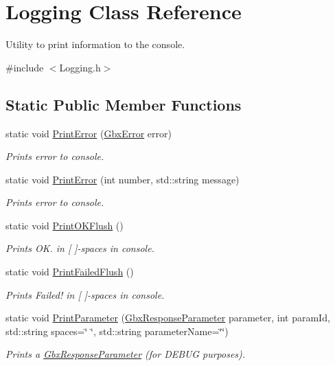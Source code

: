 \hypertarget{classLogging}{\section{Logging Class Reference}
\label{classLogging}
}


Utility to print information to the console.  




{\ttfamily \#include $<$Logging.\-h$>$}

\subsection*{Static Public Member Functions}
\begin{DoxyCompactItemize}
\item 
static void \hyperlink{classLogging_a7d4e2168b879a66d322d0b4fb2b298c4}{Print\-Error} (\hyperlink{structGbxError}{Gbx\-Error} error)
\begin{DoxyCompactList}\small\item\em Prints error to console. \end{DoxyCompactList}\item 
static void \hyperlink{classLogging_ac1397db1b8ea6625f7dd2616f530cd7d}{Print\-Error} (int number, std\-::string message)
\begin{DoxyCompactList}\small\item\em Prints error to console. \end{DoxyCompactList}\item 
\hypertarget{classLogging_a889f2ad8f991afdf0959cb1cad736fa7}{static void \hyperlink{classLogging_a889f2ad8f991afdf0959cb1cad736fa7}{Print\-O\-K\-Flush} ()}\label{classLogging_a889f2ad8f991afdf0959cb1cad736fa7}

\begin{DoxyCompactList}\small\item\em Prints O\-K. in \mbox{[} \mbox{]}-\/spaces in console. \end{DoxyCompactList}\item 
\hypertarget{classLogging_add0483bd14aef74ec988606cd7dbfc4b}{static void \hyperlink{classLogging_add0483bd14aef74ec988606cd7dbfc4b}{Print\-Failed\-Flush} ()}\label{classLogging_add0483bd14aef74ec988606cd7dbfc4b}

\begin{DoxyCompactList}\small\item\em Prints Failed! in \mbox{[} \mbox{]}-\/spaces in console. \end{DoxyCompactList}\item 
static void \hyperlink{classLogging_a1f8609052e40055fb9ef3ddd40d0620e}{Print\-Parameter} (\hyperlink{classGbxResponseParameter}{Gbx\-Response\-Parameter} parameter, int param\-Id, std\-::string spaces=\char`\"{}    \char`\"{}, std\-::string parameter\-Name=\char`\"{}\char`\"{})
\begin{DoxyCompactList}\small\item\em Prints a \hyperlink{classGbxResponseParameter}{Gbx\-Response\-Parameter} (for D\-E\-B\-U\-G purposes). \end{DoxyCompactList}\end{DoxyCompactItemize}


